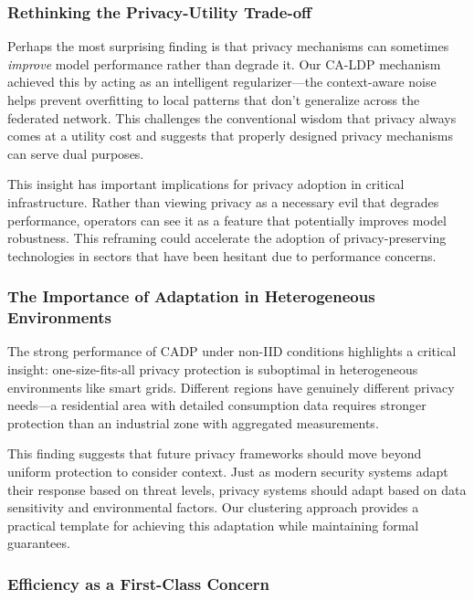 \documentclass{ieeeaccess}
\theoremstyle{definition}
\begin{document}
\subsubsection{Rethinking the Privacy-Utility Trade-off}

Perhaps the most surprising finding is that privacy mechanisms can sometimes \textit{improve} model performance rather than degrade it. Our CA-LDP mechanism achieved this by acting as an intelligent regularizer—the context-aware noise helps prevent overfitting to local patterns that don't generalize across the federated network. This challenges the conventional wisdom that privacy always comes at a utility cost and suggests that properly designed privacy mechanisms can serve dual purposes.

This insight has important implications for privacy adoption in critical infrastructure. Rather than viewing privacy as a necessary evil that degrades performance, operators can see it as a feature that potentially improves model robustness. This reframing could accelerate the adoption of privacy-preserving technologies in sectors that have been hesitant due to performance concerns.

\subsubsection{The Importance of Adaptation in Heterogeneous Environments}

The strong performance of CADP under non-IID conditions highlights a critical insight: one-size-fits-all privacy protection is suboptimal in heterogeneous environments like smart grids. Different regions have genuinely different privacy needs—a residential area with detailed consumption data requires stronger protection than an industrial zone with aggregated measurements.

This finding suggests that future privacy frameworks should move beyond uniform protection to consider context. Just as modern security systems adapt their response based on threat levels, privacy systems should adapt based on data sensitivity and environmental factors. Our clustering approach provides a practical template for achieving this adaptation while maintaining formal guarantees.

\subsubsection{Efficiency as a First-Class Concern}
\end{document}
